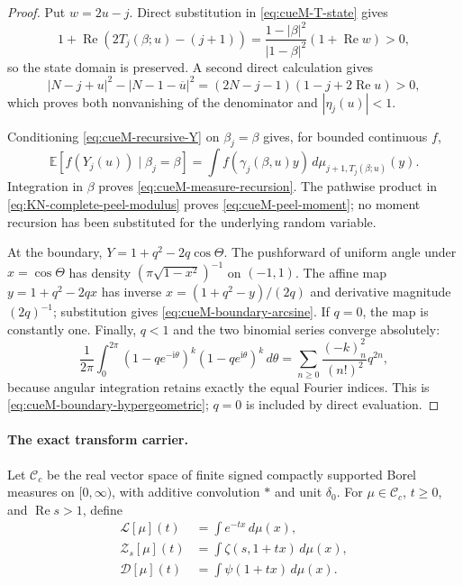 \begin{proof}
Put $w=2u-j$.  Direct substitution in \eqref{eq:cueM-T-state} gives
\begin{equation}
 1+\operatorname{Re}(2T_j(\beta;u)-(j+1))
 =\frac{1-|\beta|^2}{|1-\beta|^2}
  (1+\operatorname{Re}w)>0,
 \label{eq:cueM-state-propagation}
\end{equation}
so the state domain is preserved.  A second direct calculation gives
\begin{equation}
 |N-j+u|^2-|N-1-\overline u|^2
 =(2N-j-1)(1-j+2\operatorname{Re}u)>0,
 \label{eq:cueM-eta-bound}
\end{equation}
which proves both nonvanishing of the denominator and $|\eta_j(u)|<1$.

Conditioning \eqref{eq:cueM-recursive-Y} on $\beta_j=\beta$ gives, for bounded continuous
$f$,
\[
 \mathbb E[f(Y_j(u))\mid\beta_j=\beta]
 =\int f(\gamma_j(\beta,u)y)\,
 d\mu_{j+1,T_j(\beta;u)}(y).
\]
Integration in $\beta$ proves \eqref{eq:cueM-measure-recursion}.  The pathwise product in
\eqref{eq:KN-complete-peel-modulus} proves \eqref{eq:cueM-peel-moment}; no moment recursion
has been substituted for the underlying random variable.

At the boundary,
$Y=1+q^2-2q\cos\Theta$.  The pushforward of uniform angle under $x=\cos\Theta$ has density
$(\pi\sqrt{1-x^2})^{-1}$ on $(-1,1)$.  The affine map
$y=1+q^2-2qx$ has inverse $x=(1+q^2-y)/(2q)$ and derivative magnitude $(2q)^{-1}$;
substitution gives \eqref{eq:cueM-boundary-arcsine}.  If $q=0$, the map is constantly one.
Finally, $q<1$ and the two binomial series converge absolutely:
\[
 \frac1{2\pi}\int_0^{2\pi}
 (1-qe^{-\mathrm i\theta})^k(1-qe^{\mathrm i\theta})^k\,d\theta
 =\sum_{n\geq0}\frac{(-k)_n^2}{(n!)^2}q^{2n},
\]
because angular integration retains exactly the equal Fourier indices.  This is
\eqref{eq:cueM-boundary-hypergeometric}; $q=0$ is included by direct evaluation.
\end{proof}

\paragraph{The exact transform carrier.}
Let $\mathcal C_c$ be the real vector space of finite signed compactly supported Borel
measures on $[0,\infty)$, with additive convolution $*$ and unit $\delta_0$.  For
$\mu\in\mathcal C_c$, $t\geq0$, and $\operatorname{Re}s>1$, define
\begin{align}
 \mathcal L[\mu](t)&=\int e^{-tx}\,d\mu(x),
 \label{eq:cueM-Laplace}\\
 \mathcal Z_s[\mu](t)&=\int\zeta(s,1+tx)\,d\mu(x),
 \label{eq:cueM-Hurwitz}\\
 \mathcal D[\mu](t)&=\int\psi(1+tx)\,d\mu(x).
 \label{eq:cueM-digamma}
\end{align}

